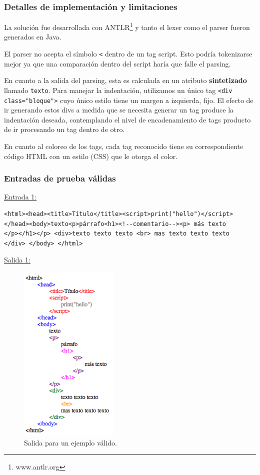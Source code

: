 \newpage
\subsubsection{Detalles de implementación y limitaciones}
La solución fue desarrollada con ANTLR\footnote{www.antlr.org} y tanto el lexer como el parser fueron generados en Java.

El parser no acepta el símbolo \verb|<| dentro de un tag script. Esto podría tokenizarse mejor ya que una comparación dentro del script haría que falle el parsing.

En cuanto a la salida del parsing, esta es calculada en un atributo \textbf{sintetizado} llamado \texttt{texto}. Para manejar la indentación, utilizamos un único tag \verb|<div class="bloque">| cuyo único estilo tiene un margen a izquierda, fijo. El efecto de ir generando estos divs a medida que se necesita generar un tag produce la indentación deseada, contemplando el nivel de encadenamiento de tags producto de ir procesando un tag dentro de otro.

En cuanto al coloreo de los tags, cada tag reconocido tiene su correspondiente código HTML con un estilo (CSS) que le otorga el color.

\subsubsection{Entradas de prueba válidas}

\underline{Entrada 1:}
\begin{verbatim}
<html><head><title>Título</title><script>print("hello")</script>
</head><body>texto<p>párrafo<h1><!--comentario--><p> más texto
</p></h1></p> <div>texto texto texto <br> mas texto texto texto
</div> </body> </html>\end{verbatim}

\underline{Salida 1:}

\begin{figure}[h!]
\includegraphics[width=4.7cm]{img/ejemplo1.png}
      \caption{Salida para un ejemplo válido.}
      \label{salida1}
\end{figure}

